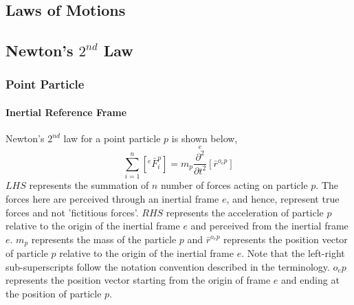 \documentclass[a4paper, 12pt]{report}
\begin{document}
\begin{center}
\chapter{Laws of Motions}
\begin{comment}
Probably should rename rigid body to system of particles. There has to be a distinction between the two. Rigid bodies have the constraint that particles cannot move with respect to one another meanwhile for a system of particles, particles can still move relative to one another. Think of an aircraft as a rigid body meanwhile the earth and moon as a system of particles.


\end{comment}
\section{Newton's $2^{nd}$ Law}
\begin{comment}
\end{comment}
\subsection{Point Particle}
\begin{comment}
\end{comment}
\subsubsection{Inertial Reference Frame}
\begin{comment}
\end{comment}
Newton's $2^{nd}$ law for a point particle $p$ is shown below,
$$\sum^{n}_{i = 1}\left[{}^{e}\bar{F}^{p}_{i}\right] = m_{p}\overset{e}{\frac{\partial^{2}}{\partial t^{2}}}[\bar{r}^{o_{e}p}]$$
$LHS$ represents the summation of $n$ number of forces acting on particle $p$. The forces here are perceived through an inertial frame $e$, and hence, represent true forces and not 'fictitious forces'. $RHS$ represents the acceleration of particle $p$ relative to the origin of the inertial frame $e$ and perceived from the inertial frame $e$. $m_{p}$ represents the mass of the particle $p$ and $\bar{r}^{o_{e}p}$ represents the position vector of particle $p$ relative to the origin of the inertial frame $e$. Note that the left-right sub-superscripts follow the notation convention described in the terminology. $o_{e}p$ represents the position vector starting from the origin of frame $e$ and ending at the position of particle $p$. 

\end{center}
\end{document}
